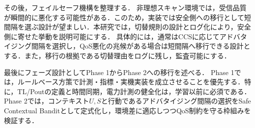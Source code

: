 その後，フェイルセーフ機構を整理する．
非理想スキャン環境では，受信品質が瞬間的に悪化する可能性がある．このため，実装では安全側への移行として短間隔を選ぶ設計が望ましい．本研究では，切替規則の設計とログ化により，安全側に寄せた挙動を説明可能にする．
具体的には，通常はCCSに応じてアドバタイジング間隔を選択し，QoS悪化の兆候がある場合は短間隔へ移行できる設計とする．また，移行の根拠である切替理由をログに残し，監査可能にする．

最後にフェーズ設計としてPhase 1からPhase 2への移行を述べる．
Phase 1では，ルールベース方策で計測・指標・実機実装を成立させることを優先する．特に，TL/Poutの定義と時間同期，電力計測の健全化は，学習以前に必須である．Phase 2では，コンテキスト$U,S$と行動であるアドバタイジング間隔の選択をSafe Contextual Banditとして定式化し，環境差に適応しつつQoS制約を守る枠組みを検証する．








